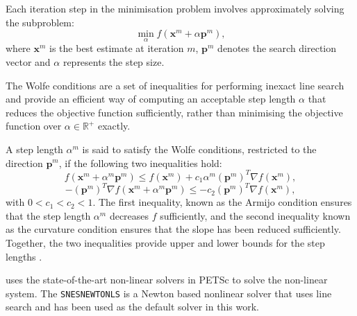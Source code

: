 	Each iteration step in the minimisation problem involves approximately solving the subproblem:
	\begin{equation}
		\min_\alpha f\left(\mathbf{x}^m + \alpha \mathbf{p}^m\right),
	\end{equation}
	where $\mathbf{x}^m$ is the best estimate at iteration $m$, $\mathbf{p}^m$ denotes the search direction vector and $\alpha$ represents the step size.

	The Wolfe conditions are a set of inequalities for performing inexact line search and provide an efficient way of computing an acceptable step length $\alpha$  that reduces the objective function sufficiently, rather than minimising the objective function over $\alpha \in \mathbb {R}^{+}$ exactly.

	A step length $\alpha^m$ is said to satisfy the Wolfe conditions, restricted to the direction $\mathbf{p}^m$, if the following two inequalities hold:
	\begin{equation}
		f\left(\mathbf{x}^m + \alpha^m \mathbf{p}^m\right) \leq f\left(\mathbf{x}^m \right) + c_1 \alpha^m \left(\mathbf{p}^m\right)^T \nabla f\left(\mathbf{x}^m \right),
	\end{equation}
	\begin{equation}
		- \left(\mathbf{p}^m\right)^T \nabla f\left(\mathbf{x}^m + \alpha^m \mathbf{p}^m\right) \leq - c_2 \left(\mathbf{p}^m\right)^T \nabla f\left(\mathbf{x}^m \right),
	\end{equation}
	with $0 < c_1 < c_2 < 1$. The first inequality, known as the Armijo condition ensures that the step length $\alpha^m$ decreases $f$ sufficiently, and the second inequality known as the curvature condition ensures that the slope has been reduced sufficiently. Together, the two inequalities provide upper and lower bounds for the step lengths \cite{Nocedal06}.
	
	{\GEM} uses the state-of-the-art non-linear solvers in PETSc to solve the non-linear system. The \texttt{SNESNEWTONLS} is a Newton based nonlinear solver that uses line search and has been used as the default solver in this work. 
	
	
